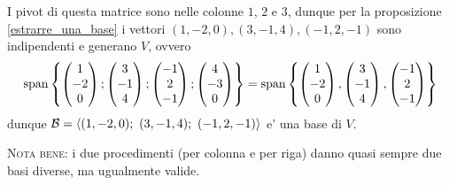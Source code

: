 \begin{example}
    I pivot di questa matrice sono nelle colonne $1$, $2$ e $3$, dunque per la proposizione \ref{estrarre_una_base} i vettori $(1, -2, 0), (3, -1, 4), (-1, 2, -1)$ sono indipendenti e generano $V$, ovvero \[
        \operatorname{span}\left\{\begin{pmatrix}
            1 \\ -2 \\ 0
        \end{pmatrix}; \begin{pmatrix}
            3 \\ -1 \\ 4
        \end{pmatrix}; \begin{pmatrix}
            -1 \\ 2 \\ -1
        \end{pmatrix}; \begin{pmatrix}
            4 \\ -3 \\ 0
        \end{pmatrix}\right\} = \operatorname{span}\left\{\begin{pmatrix} 1 \\ -2 \\ 0 \end{pmatrix}, \begin{pmatrix} 3 \\ -1 \\ 4 \end{pmatrix}, \begin{pmatrix} -1 \\ 2 \\ -1 \end{pmatrix}\right\}    
    \]
    dunque $\mathcal{B} = \left\langle (1, -2, 0);\ (3, -1, 4);\ (-1, 2, -1) \right\rangle$ e' una base di $V$.
\end{example}

\textsc{Nota bene:} i due procedimenti (per colonna e per riga) danno quasi sempre due basi diverse, ma ugualmente valide.

